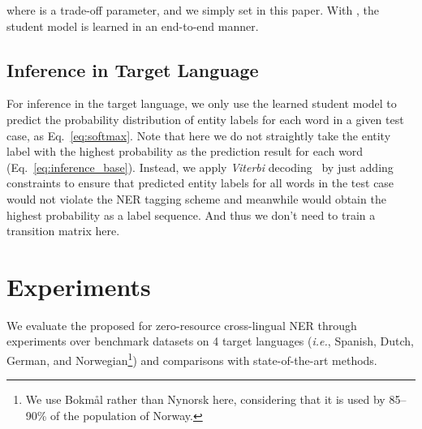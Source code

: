 \documentclass{article}
\newcommand\ie{\textit{i.e.}}
\newcommand\unitrans{\text{UniTrans}}
\begin{document}
where  is a trade-off parameter, and we simply set  in this paper. With , the student model  is learned in an end-to-end manner.




\subsection{Inference in Target Language}
For inference in the target language, we only use the learned student model  to predict the probability distribution of entity labels for each word in a given test case, as Eq.~\ref{eq:softmax}. 
Note that here we do not straightly take the entity label with the highest probability as the prediction result for each word (Eq.~\ref{eq:inference_base}). Instead, we apply \emph{Viterbi} decoding~\cite{chen2019grn} by just adding constraints to ensure that predicted entity labels for all words in the test case would not violate the NER tagging scheme and meanwhile would obtain the highest probability as a label sequence. And thus we don't need to train a transition matrix here.


\section{Experiments}
We evaluate the proposed \unitrans{} for zero-resource cross-lingual NER through experiments over benchmark datasets on 4 target languages (\ie, Spanish, Dutch, German, and Norwegian\footnote{We use Bokmål rather than Nynorsk here, considering that it is used by 85–90\% of the population of Norway.}) and comparisons with state-of-the-art methods. 

\begin{table}[t]
    \centering
    \caption{Statistics of the benchmark datasets.}
    \label{tab:dataset}
\end{table}
\end{document}
